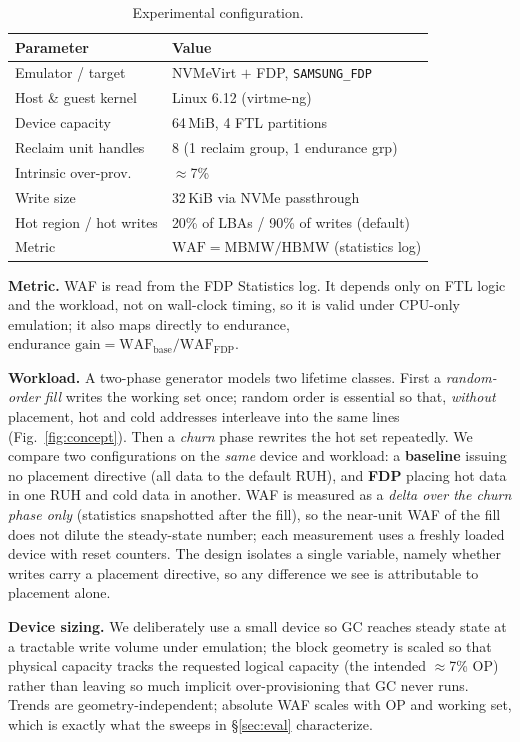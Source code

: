 \documentclass[conference,10pt]{IEEEtran}
\begin{document}
\begin{table}[t]
\centering
\caption{Experimental configuration.}
\label{tab:params}
\footnotesize
\begin{tabular}{ll}
\toprule
Parameter & Value \\
\midrule
Emulator / target      & NVMeVirt $+$ FDP, \texttt{SAMSUNG\_FDP} \\
Host \& guest kernel   & Linux 6.12 (virtme-ng) \\
Device capacity        & 64\,MiB, 4 FTL partitions \\
Reclaim unit handles   & 8 (1 reclaim group, 1 endurance grp) \\
Intrinsic over-prov.   & $\approx$7\% \\
Write size             & 32\,KiB via NVMe passthrough \\
Hot region / hot writes& 20\% of LBAs / 90\% of writes (default) \\
Metric                 & $\mathrm{WAF}=\mathrm{MBMW}/\mathrm{HBMW}$ (statistics log) \\
\bottomrule
\end{tabular}
\end{table}

\textbf{Metric.} WAF is read from the FDP Statistics log. It depends only on FTL
logic and the workload, not on wall-clock timing, so it is valid under CPU-only
emulation; it also maps directly to endurance,
$\text{endurance gain}=\mathrm{WAF}_{\text{base}}/\mathrm{WAF}_{\text{FDP}}$.

\textbf{Workload.} A two-phase generator models two lifetime classes. First a
\emph{random-order fill} writes the working set once; random order is essential
so that, \emph{without} placement, hot and cold addresses interleave into the
same lines (Fig.~\ref{fig:concept}). Then a \emph{churn} phase rewrites the hot
set repeatedly. We compare two configurations on the \emph{same} device and
workload: a \textbf{baseline} issuing no placement directive (all data to the
default RUH), and \textbf{FDP} placing hot data in one RUH and cold data in
another. WAF is measured as a \emph{delta over the churn phase only} (statistics
snapshotted after the fill), so the near-unit WAF of the fill does not dilute the
steady-state number; each measurement uses a freshly loaded device with reset
counters. The design isolates a single variable, namely whether writes carry a
placement directive, so any difference we see is attributable to placement alone.

\textbf{Device sizing.} We deliberately use a small device so GC reaches steady
state at a tractable write volume under emulation; the block geometry is scaled
so that physical capacity tracks the requested logical capacity (the intended
$\approx$7\% OP) rather than leaving so much implicit over-provisioning that GC
never runs. Trends are geometry-independent; absolute WAF scales with OP and
working set, which is exactly what the sweeps in \S\ref{sec:eval} characterize.
\end{document}
